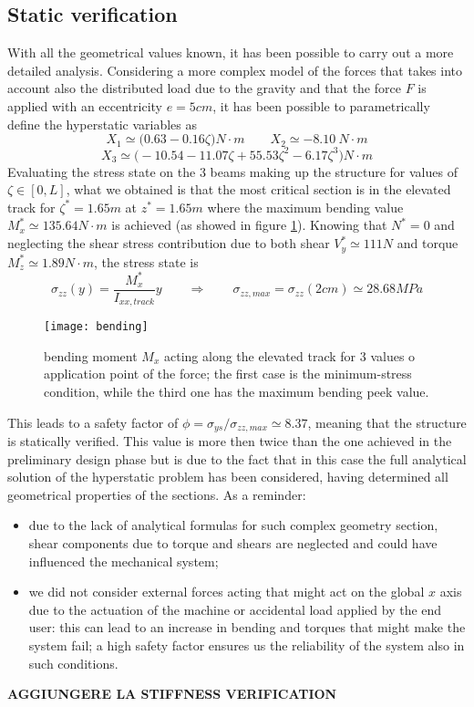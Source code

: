 \subsection{Static verification}
	With all the geometrical values known, it has been possible to carry out a more detailed analysis. Considering a more complex model of the forces that takes into account also the distributed load due to the gravity and that the force $F$ is applied with an eccentricity $e=5cm$, it has been possible to parametrically define the hyperstatic variables as
	\[ X_1 \simeq \big( 0.63-0.16\zeta\big) N\cdot m \qquad X_2 \simeq -8.10 \ N\cdot m \] \[ X_3 \simeq \big( - 10.54 - 11.07\zeta + 55.53\zeta^2 - 6.17\zeta^3 \big) N\cdot m \]
	Evaluating the stress state on the 3 beams making up the structure for values of $\zeta \in [0,L]$, what we obtained is that the most critical section is in the elevated track for $\zeta^* = 1.65m$ at $z^* = 1.65m$ where the maximum bending value $M_x^* \simeq 135.64N\cdot m$ is achieved (as showed in figure \ref{fig:bending}). Knowing that $N^* = 0$ and neglecting the shear stress contribution due to both shear $V_y^* \simeq 111N$ and torque $M_z^* \simeq 1.89N\cdot m$, the stress state is
	\[ \sigma_{zz}(y) = \frac{M_x^*}{I_{xx,track}}y \qquad \Rightarrow \qquad \sigma_{zz,max} = \sigma_{zz}(2cm) \simeq 28.68 MPa   \]
	\begin{figure}[b]
		\centering \texttt{[image: bending]}
		\caption{bending moment $M_x$ acting along the elevated track for 3 values o application point of the force; the first case is the minimum-stress condition, while the third one has the maximum bending peek value.} \label{fig:bending}
	\end{figure}
	This leads to a safety factor of $\phi = \sigma_{ys}/\sigma_{zz,max} \simeq 8.37$, meaning that the structure is statically verified. This value is more then twice than the one achieved in the preliminary design phase but is due to the fact that in this case the full analytical solution of the hyperstatic problem has been considered, having determined all geometrical properties of the sections. As a reminder:
	\begin{itemize}
		\item due to the lack of analytical formulas for such complex geometry section, shear components due to torque and shears are neglected and could have influenced the mechanical system;
		\item we did not consider external forces acting that might act on the global $x$ axis due to the actuation of the machine or accidental load applied by the end user: this can lead to an increase in bending and torques that might make the system fail; a high safety factor ensures us the reliability of the system also in such conditions.
	\end{itemize}
	
	\textbf{AGGIUNGERE LA STIFFNESS VERIFICATION}